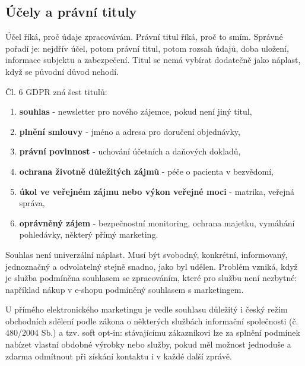 \documentclass[11pt,a4paper]{article}
\begin{document}
\subsection*{Účely a právní tituly}
Účel říká, proč údaje zpracovávám. Právní titul říká, proč to smím. Správné pořadí je: nejdřív účel, potom právní titul, potom rozsah údajů, doba uložení, informace subjektu a zabezpečení. Titul se nemá vybírat dodatečně jako náplast, když se původní důvod nehodí.

Čl. 6 GDPR zná šest titulů:
\begin{enumerate}
  \item \textbf{souhlas} - newsletter pro nového zájemce, pokud není jiný titul,
  \item \textbf{plnění smlouvy} - jméno a adresa pro doručení objednávky,
  \item \textbf{právní povinnost} - uchování účetních a daňových dokladů,
  \item \textbf{ochrana životně důležitých zájmů} - péče o pacienta v bezvědomí,
  \item \textbf{úkol ve veřejném zájmu nebo výkon veřejné moci} - matrika, veřejná správa,
  \item \textbf{oprávněný zájem} - bezpečnostní monitoring, ochrana majetku, vymáhání pohledávky, některý přímý marketing.
\end{enumerate}

Souhlas není univerzální náplast. Musí být svobodný, konkrétní, informovaný, jednoznačný a odvolatelný stejně snadno, jako byl udělen. Problém vzniká, když je služba podmíněna souhlasem se zpracováním, které pro službu není nezbytné: například nákup v e-shopu podmíněný souhlasem s marketingem.

U přímého elektronického marketingu je vedle souhlasu důležitý i český režim obchodních sdělení podle zákona o některých službách informační společnosti (č. 480/2004 Sb.) a tzv. soft opt-in: stávajícímu zákazníkovi lze za splnění podmínek nabízet vlastní obdobné výrobky nebo služby, pokud měl možnost jednoduše a zdarma odmítnout při získání kontaktu i v každé další zprávě.
\end{document}
